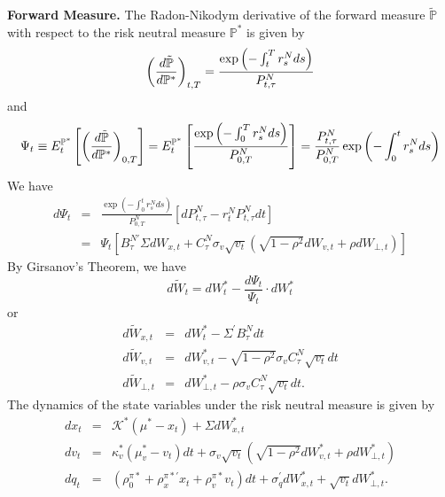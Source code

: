 \documentclass{article}
\begin{document}
\textbf{Forward Measure.} The Radon-Nikodym derivative of the forward
measure $\mathbb{\tilde{P}}$ with respect to the risk neutral measure $%
\mathbb{P}^{\ast }$ is given by%
\begin{equation}
\left( \frac{d\mathbb{\tilde{P}}}{d\mathbb{P}^{\ast }}\right) _{t,T}=\frac{%
\exp \left( -\int_{t}^{T}r_{s}^{N}ds\right) }{P_{t,\tau }^{N}}
\end{equation}%
and%
\begin{equation*}
\Psi _{t}\equiv E_{t}^{\mathbb{P}^{\ast }}\left[ \left( \frac{d\mathbb{%
\tilde{P}}}{d\mathbb{P}^{\ast }}\right) _{0,T}\right] =E_{t}^{\mathbb{P}%
^{\ast }}\left[ \frac{\exp \left( -\int_{0}^{T}r_{s}^{N}ds\right) }{%
P_{0,T}^{N}}\right] =\frac{P_{t,\tau }^{N}}{P_{0,T}^{N}}\exp \left(
-\int_{0}^{t}r_{s}^{N}ds\right) 
\end{equation*}%
We have%
\begin{eqnarray*}
d\Psi _{t} &=&\frac{\exp \left( -\int_{0}^{t}r_{s}^{N}ds\right) }{P_{0,T}^{N}%
}\left[ dP_{t,\tau }^{N}-r_{t}^{N}P_{t,\tau }^{N}dt\right]  \\
&=&\Psi _{t}\left[ B_{\tau }^{N\prime }\Sigma dW_{x,t}+C_{\tau }^{N}\sigma
_{v}\sqrt{v_{t}}\left( \sqrt{1-\rho ^{2}}dW_{v,t}+\rho dW_{\bot ,t}\right) %
\right] 
\end{eqnarray*}%
By Girsanov's Theorem, we have%
\begin{equation*}
d\tilde{W}_{t}=dW_{t}^{\ast }-\frac{d\Psi _{t}}{\Psi _{t}}\cdot dW_{t}^{\ast
}
\end{equation*}%
or%
\begin{eqnarray*}
d\tilde{W}_{x,t} &=&dW_{t}^{\ast }-\Sigma ^{\prime }B_{\tau }^{N}dt \\
d\tilde{W}_{v,t} &=&dW_{v,t}^{\ast }-\sqrt{1-\rho ^{2}}\sigma _{v}C_{\tau
}^{N}\sqrt{v_{t}}dt \\
d\tilde{W}_{\bot ,t} &=&dW_{\bot ,t}^{\ast }-\rho \sigma _{v}C_{\tau }^{N}%
\sqrt{v_{t}}dt.
\end{eqnarray*}%
The dynamics of the state variables under the risk neutral measure is given
by%
\begin{eqnarray*}
dx_{t} &=&\mathcal{K}^{\ast }\left( \mu ^{\ast }-x_{t}\right) +\Sigma
dW_{x,t}^{\ast } \\
dv_{t} &=&\kappa _{v}^{\ast }\left( \mu _{v}^{\ast }-v_{t}\right) dt+\sigma
_{v}\sqrt{v_{t}}\left( \sqrt{1-\rho ^{2}}dW_{v,t}^{\ast }+\rho dW_{\bot
,t}^{\ast }\right)  \\
dq_{t} &=&\left( \rho _{0}^{\pi \ast }+\rho _{x}^{\pi \ast \prime
}x_{t}+\rho _{v}^{\pi \ast }v_{t}\right) dt+\sigma _{q}^{\prime
}dW_{x,t}^{\ast }+\sqrt{v_{t}}dW_{\bot ,t}^{\ast }.
\end{eqnarray*}%
\end{document}
